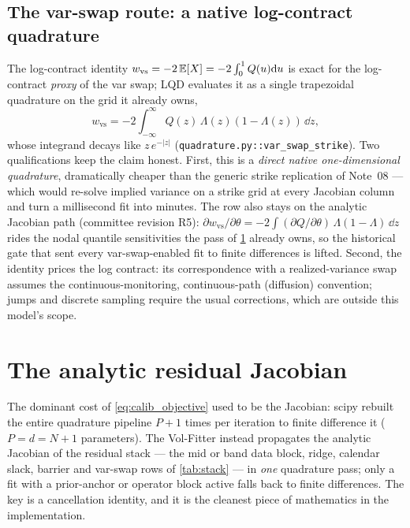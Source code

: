 \documentclass[11pt]{article}
\begin{document}
\subsection{The var-swap route: a native log-contract quadrature}
\label{sec:varswap}

The log-contract identity $w_{\text{vs}}=-2\,\mathbb{E}[X]=-2\int_0^1 Q(u)\mathrm{d} u$ is
exact for the log-contract \emph{proxy} of the var swap; LQD evaluates it as a
single trapezoidal quadrature on the grid it already owns,
\begin{equation}
w_{\text{vs}}=-2\int_{-\infty}^{\infty}Q(z)\,\Lambda(z)(1-\Lambda(z))\,\dd z,
\end{equation}
whose integrand decays like $z\,e^{-|z|}$
(\texttt{quadrature.py::var\_swap\_strike}). Two qualifications keep the claim
honest. First, this is a \emph{direct native one-dimensional quadrature},
dramatically cheaper than the generic strike replication of Note~08 --- which
would re-solve implied variance on a strike grid at every Jacobian column and
turn a millisecond fit into minutes. The row also stays on the analytic
Jacobian path (committee revision R5):
$\partial w_{\text{vs}}/\partial\theta
=-2\int(\partial Q/\partial\theta)\,\Lambda(1-\Lambda)\,\dd z$ rides the
nodal quantile sensitivities the pass of \cref{sec:jacobian} already owns, so
the historical gate that sent every var-swap-enabled fit to finite
differences is lifted. Second, the identity prices the
log contract: its correspondence with a realized-variance swap assumes the
continuous-monitoring, continuous-path (diffusion) convention; jumps and
discrete sampling require the usual corrections, which are outside this
model's scope.

\section{The analytic residual Jacobian}
\label{sec:jacobian}

The dominant cost of \eqref{eq:calib_objective} used to be the Jacobian: scipy
rebuilt the entire quadrature pipeline $P+1$ times per iteration to finite
difference it ($P=d=N+1$ parameters). The Vol-Fitter instead propagates the
analytic Jacobian of the residual stack --- the mid or band data block,
ridge, calendar slack, barrier and var-swap rows of \cref{tab:stack} --- in
\emph{one} quadrature pass; only a fit with a prior-anchor or operator block
active falls back to finite differences. The key is a cancellation identity,
and it is the cleanest piece of mathematics in the implementation.
\end{document}
